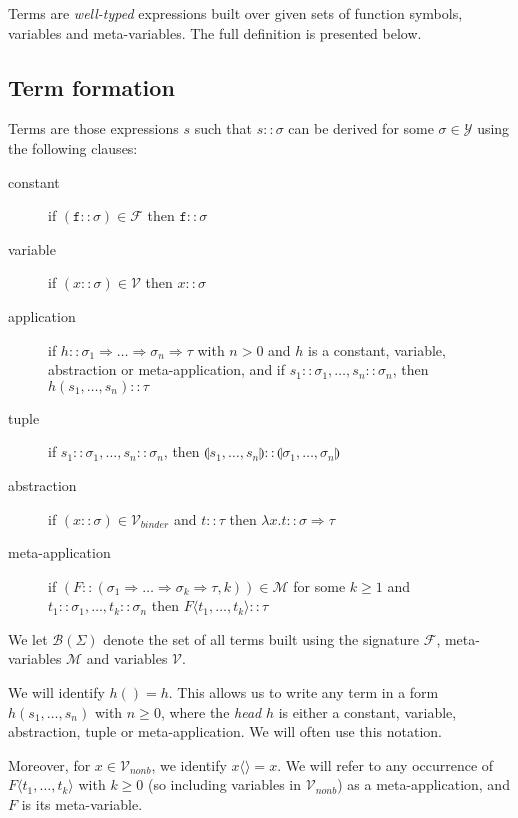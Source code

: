 \documentclass{lmcs}
\theoremstyle{theorem}\newtheorem{theorem}{Theorem}
\theoremstyle{theorem}\newtheorem{lemma}[theorem]{Lemma}
\theoremstyle{theorem}\newtheorem{corollary}[theorem]{Corollary}
\theoremstyle{definition}\newtheorem{definition}[theorem]{Definition}
\theoremstyle{definition}\newtheorem{example}[theorem]{Example}
\newcommand{\F}{\mathcal{F}}
\newcommand{\V}{\mathcal{V}}
\newcommand{\M}{\mathcal{M}}
\newcommand{\Vfree}{\mathcal{V}_{\mathit{nonb}}}
\newcommand{\Vbound}{\mathcal{V}_{\mathit{binder}}}
\newcommand{\Types}{\mathcal{Y}}
\newcommand{\MTerms}{\mathcal{B}}
\newcommand{\atype}{\sigma}
\newcommand{\btype}{\tau}
\newcommand{\identifier}[1]{\mathtt{#1}}
\newcommand{\afun}{\identifier{f}}
\newcommand{\avar}{x}
\newcommand{\ameta}{F}
\newcommand{\abs}[2]{\lambda #1.#2}
\newcommand{\meta}[2]{#1\langle#2\rangle}
\newcommand{\tuple}[2]{\llparenthesis #1,\dots,#2 \rrparenthesis}
\newcommand{\product}[2]{\llparenthesis #1,\dots,#2 \rrparenthesis}
\newcommand{\arrtype}{\Rightarrow}
\begin{document}
Terms are \emph{well-typed} expressions built over given sets of function
symbols, variables and meta-variables. The full definition is presented below.

\subsection{Term formation}\label{subsec:form}

Terms are those expressions $s$ such that $s :: \atype$ can be derived for some
$\atype \in \Types$ using the following clauses:

\begin{description}
\item[constant] if $(\afun :: \atype) \in \F$ then $\afun :: \atype$
\item[variable] if $(\avar :: \atype) \in \V$ then $\avar :: \atype$
\item[application] if $h :: \atype_1 \arrtype \dots \arrtype \atype_n \arrtype
  \btype$ with $n > 0$ and $h$ is a constant, variable, abstraction or
  meta-application, and if $s_1 :: \atype_1,\dots,s_n :: \atype_n$,
  then $h(s_1,\dots,s_n) :: \btype$
\item[tuple] if $s_1 :: \atype_1,\dots,s_n :: \atype_n$, then
  $\tuple{s_1}{s_n} :: \product{\atype_1}{\atype_n}$
\item[abstraction] if $(\avar :: \atype) \in \Vbound$ and $t :: \btype$ then
  $\abs{\avar}{t} :: \atype \arrtype \btype$
\item[meta-application] if $(\ameta :: (\atype_1 \arrtype \dots \arrtype
  \atype_k \arrtype \btype,k)) \in \M$ for some $k \geq 1$ and $t_1 :: \atype_1,
  \dots,t_k :: \atype_n$ then $\meta{\ameta}{t_1,\dots,t_k} :: \btype$
\end{description}

We let $\MTerms(\Sigma)$ denote the set of all terms built using the signature
$\F$, meta-variables $\M$ and variables $\V$.

We will identify $h() = h$.  This allows us to write any term in a form $h(s_1,
\dots,s_n)$ with $n \geq 0$, where the \emph{head} $h$ is either a constant,
variable, abstraction, tuple or meta-application.  We will often use this notation.

Moreover, for $\avar \in \Vfree$, we identify $\meta{\avar}{} = \avar$.  We will
refer to any occurrence of $\meta{\ameta}{t_1,\dots,t_k}$ with $k \geq 0$ (so
including variables in $\Vfree$) as a meta-application, and $\ameta$ is its
meta-variable.
\end{document}
